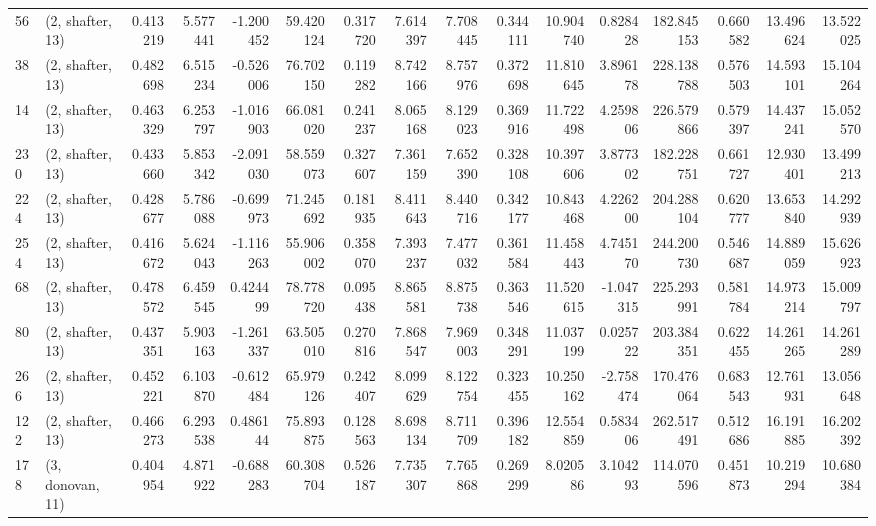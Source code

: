 \begin{tabular}{llrrrrrrrrrrrrrr}
56  &  (2, shafter, 13) &   0.413219 &   5.577441 &  -1.200452 &    59.420124 &   0.317720 &   7.614397 &   7.708445 &  0.344111 &  10.904740 &   0.828428 &    182.845153 &    0.660582 &   13.496624 &   13.522025 \\
38  &  (2, shafter, 13) &   0.482698 &   6.515234 &  -0.526006 &    76.702150 &   0.119282 &   8.742166 &   8.757976 &  0.372698 &  11.810645 &   3.896178 &    228.138788 &    0.576503 &   14.593101 &   15.104264 \\
14  &  (2, shafter, 13) &   0.463329 &   6.253797 &  -1.016903 &    66.081020 &   0.241237 &   8.065168 &   8.129023 &  0.369916 &  11.722498 &   4.259806 &    226.579866 &    0.579397 &   14.437241 &   15.052570 \\
230 &  (2, shafter, 13) &   0.433660 &   5.853342 &  -2.091030 &    58.559073 &   0.327607 &   7.361159 &   7.652390 &  0.328108 &  10.397606 &   3.877302 &    182.228751 &    0.661727 &   12.930401 &   13.499213 \\
224 &  (2, shafter, 13) &   0.428677 &   5.786088 &  -0.699973 &    71.245692 &   0.181935 &   8.411643 &   8.440716 &  0.342177 &  10.843468 &   4.226200 &    204.288104 &    0.620777 &   13.653840 &   14.292939 \\
254 &  (2, shafter, 13) &   0.416672 &   5.624043 &  -1.116263 &    55.906002 &   0.358070 &   7.393237 &   7.477032 &  0.361584 &  11.458443 &   4.745170 &    244.200730 &    0.546687 &   14.889059 &   15.626923 \\
68  &  (2, shafter, 13) &   0.478572 &   6.459545 &   0.424499 &    78.778720 &   0.095438 &   8.865581 &   8.875738 &  0.363546 &  11.520615 &  -1.047315 &    225.293991 &    0.581784 &   14.973214 &   15.009797 \\
80  &  (2, shafter, 13) &   0.437351 &   5.903163 &  -1.261337 &    63.505010 &   0.270816 &   7.868547 &   7.969003 &  0.348291 &  11.037199 &   0.025722 &    203.384351 &    0.622455 &   14.261265 &   14.261289 \\
266 &  (2, shafter, 13) &   0.452221 &   6.103870 &  -0.612484 &    65.979126 &   0.242407 &   8.099629 &   8.122754 &  0.323455 &  10.250162 &  -2.758474 &    170.476064 &    0.683543 &   12.761931 &   13.056648 \\
122 &  (2, shafter, 13) &   0.466273 &   6.293538 &   0.486144 &    75.893875 &   0.128563 &   8.698134 &   8.711709 &  0.396182 &  12.554859 &   0.583406 &    262.517491 &    0.512686 &   16.191885 &   16.202392 \\
178 &  (3, donovan, 11) &   0.404954 &   4.871922 &  -0.688283 &    60.308704 &   0.526187 &   7.735307 &   7.765868 &  0.269299 &   8.020586 &   3.104293 &    114.070596 &    0.451873 &   10.219294 &   10.680384 \\

\end{tabular}
